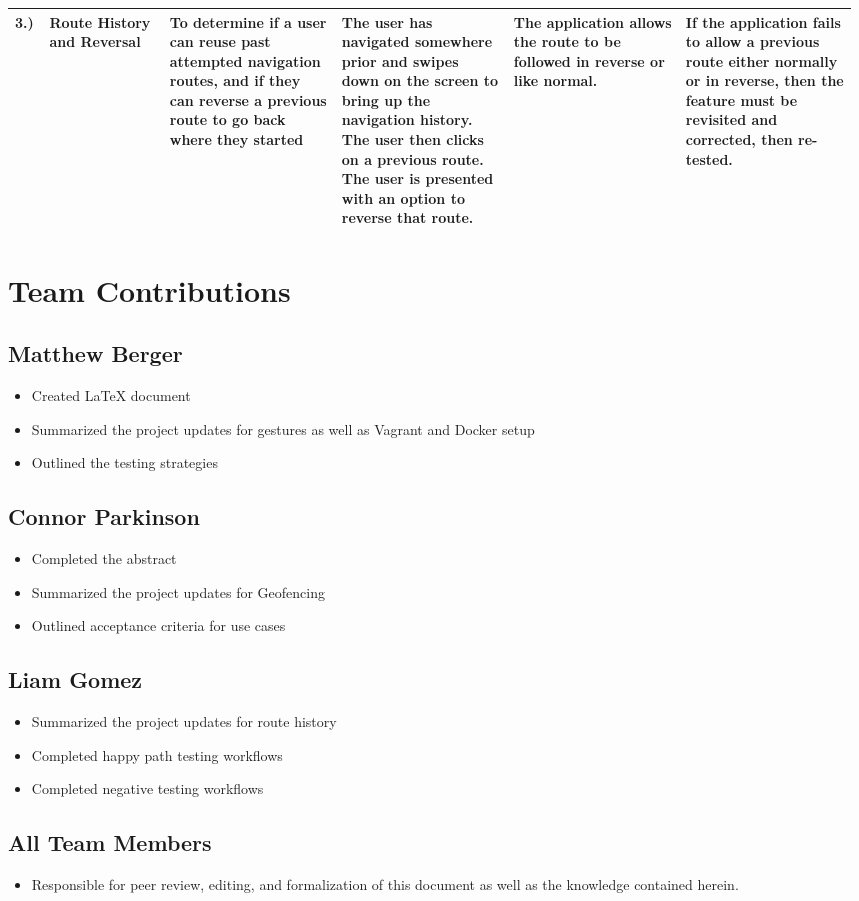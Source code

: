 \documentclass{scrreprt}
\begin{document}
\begin{table}[h]
\begin{tabular}{|p{0.04\linewidth}|p{0.14\linewidth}|p{0.2\linewidth}|p{0.2\linewidth}|p{0.2\linewidth}|p{0.2\linewidth}|}
\cellcolor[HTML]{9B9B9B}3.) & Route History and Reversal & To determine if a user can reuse past attempted navigation routes, and if they can reverse a previous route to go back where they started & The user has navigated somewhere prior and swipes down on the screen to bring up the navigation history. The user then clicks on a previous route. The user is presented with an option to reverse that route. & The application allows the route to be followed in reverse or like normal.                                                                                                                                          & If the application fails to allow a previous route either normally or in reverse, then the feature must be revisited and corrected, then re-tested.                                                                             \\ \hline
\end{tabular}
\end{table}

\chapter{Team Contributions}
	\section{Matthew Berger}
		\begin{itemize}
			\item Created LaTeX document
			\item Summarized the project updates for gestures as well as Vagrant and Docker setup
			\item Outlined the testing strategies
		\end{itemize}
	\section{Connor Parkinson}
		\begin{itemize}
			\item Completed the abstract
			\item Summarized the project updates for Geofencing
			\item Outlined acceptance criteria for use cases
		\end{itemize}
	\section{Liam Gomez}
		\begin{itemize}
			\item Summarized the project updates for route history
			\item Completed happy path testing workflows
			\item Completed negative testing workflows
		\end{itemize}
	\section{All Team Members}
		\begin{itemize}
			\item Responsible for peer review, editing, and formalization of this document as well as the knowledge contained herein.
		\end{itemize}
\end{document}
